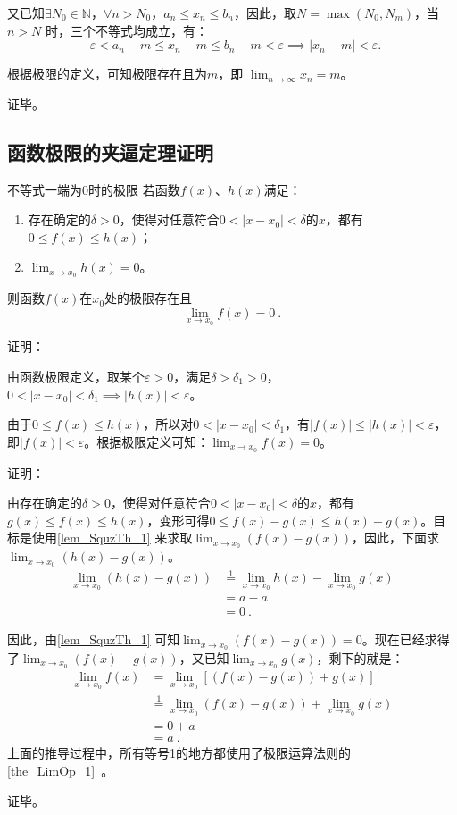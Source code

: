 又已知$\exists N_0\in \mathbb{N}$，$\forall n>N_0$，$a_n\leq x_n\leq b_n$，因此，取$N=\max(N_0, N_m)$，当 $n > N$ 时，三个不等式均成立，有：
\begin{equation}
- \varepsilon < a_n-m \leq x_n-m \leq b_n-m <\varepsilon\implies |x_n-m|<\varepsilon.~
\end{equation}

根据极限的定义，可知极限存在且为$m$，即 $\lim_{n \to \infty} x_n = m$。

证毕。


\subsection{函数极限的夹逼定理证明}




\begin{lemma}{不等式一端为0时的极限}\label{lem_SquzTh_1}
若函数$f(x)$、$h(x)$满足：
\begin{enumerate}
\item 存在确定的$\delta>0$，使得对任意符合$0<|x-x_0|<\delta$的$x$，都有$0\leq f(x)\leq h(x)$；
\item $\lim _{x\to x_0}h(x)=0$。
\end{enumerate}
则函数$f(x)$在$x_0$处的极限存在且
\begin{equation}
\lim _{x\to x_0}f(x)=0~.
\end{equation}

证明：

由函数极限定义，取某个$\varepsilon>0$，满足$\delta>\delta_1>0$，$0<|x-x_0|<\delta_1\implies|h(x)|<\varepsilon$。

由于$0\leq f(x)\leq h(x)$，所以对$0<|x-x_0|<\delta_1$，有$|f(x)|\leq |h(x)|<\varepsilon$，即$|f(x)|<\varepsilon$。根据极限定义可知：$\lim _{x\to x_0}f(x)=0$。

\end{lemma}

证明：

由存在确定的$\delta>0$，使得对任意符合$0<|x-x_0|<\delta$的$x$，都有$g(x)\leq f(x)\leq h(x)$，变形可得$0\leq f(x)-g(x)\leq h(x)-g(x)$。目标是使用\autoref{lem_SquzTh_1} 来求取$\lim _{x\to x_0}(f(x)-g(x))$，因此，下面求$\lim _{x\to x_0}(h(x)-g(x))$。
$$
\begin{align*}
\lim _{x\to x_0}(h(x)-g(x))&\overset{\mathrm{1}}{=}\lim _{x\to x_0}h(x)-\lim _{x\to x_0}g(x)\\
&=a-a\\
&=0~.
\end{align*}
$$

因此，由\autoref{lem_SquzTh_1} 可知$\lim _{x\to x_0}(f(x)-g(x))=0$。现在已经求得了$\lim _{x\to x_0}(f(x)-g(x))$，又已知$\lim _{x\to x_0}g(x)$，剩下的就是：
$$
\begin{align*}
\lim _{x\to x_0}f(x) &= \lim _{x\to x_0}[(f(x)-g(x))+g(x)] \\ 
&\overset{\mathrm{1}}{=} \lim _{x\to x_0}(f(x)-g(x))+\lim _{x\to x_0}g(x)\\ 
&= 0+a\\ 
&=a~.\end{align*}
$$
上面的推导过程中，所有等号1的地方都使用了极限运算法则的\autoref{the_LimOp_1}~。

证毕。
